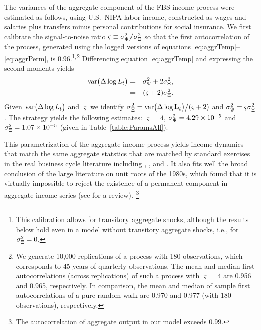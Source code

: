 \documentclass[12pt,titlepage]{econtex}
\begin{document}
The variances of the aggregate component of the FBS income process were estimated as follows, using U.S.\ NIPA labor income, constructed as wages and salaries plus transfers minus personal contributions for social insurance. We first calibrate the signal-to-noise ratio $\varsigma\equiv\sigma_\Psi^2\big/\sigma_\Xi^2$ so that the first autocorrelation of the process, generated using the logged versions of equations \eqref{eq:aggrTemp}--\eqref{eq:aggrPerm}, is 0.96.\footnote{This calibration allows for transitory aggregate shocks, although the results below hold even in a model without transitory aggregate shocks, i.e., for $\sigma_\Xi^2=0$.
}${}^{,}$\footnote{We generate 10,000 replications of a process with 180 observations, which corresponds to 45 years of quarterly observations. The mean and median first autocorrelations (across replications) of such a process with $\varsigma=4$ are 0.956 and 0.965, respectively. In comparison, the mean and median of sample first autocorrelations of a pure random walk are 0.970 and 0.977 (with 180 observations), respectively.}
Differencing equation \eqref{eq:aggrTemp} and expressing the second moments yields
\begin{eqnarray*}
\mathrm{var}\big(\Delta\log L_{t}\big)&=&\sigma_\Psi^2+2\sigma_\Xi^2,\\
                                        &=&(\varsigma+2)\sigma_\Xi^2.
\end{eqnarray*}
Given  $\mathrm{var}\big(\Delta\log L_{t}\big)$ and $\varsigma$ we identify
$\sigma_\Xi^2=\mathrm{var}\big(\Delta\log\mathbf{L}_{t}\big)\big/(\varsigma+2)$ and $\sigma_\Psi^2=\varsigma\sigma_\Xi^2$.
The strategy yields the following estimates: $\varsigma=4$, $\sigma_\Psi^2=4.29\times 10^{-5}$ and
 $\sigma_\Xi^2=1.07\times10^{-5}$ (given in Table~\ref{table:ParamsAll}).

This parametrization of the aggregate income process yields income dynamics
that match the same aggregate statstics that are matched by standard
 exercises in the real business cycle literature including \citet{jermannProduction},
 \citet{bcfHabits}, and
 \citet{ckmCritique}.  It also fits well the broad
 conclusion of the large literature on unit roots of the 1980s, which found that it is virtually impossible to
 reject the existence of a permanent component in aggregate
 income series (see \citet{stock:Handbook} for a review).
 \footnote{The autocorrelation of aggregate output in our model exceeds 0.99.}
\end{document}
